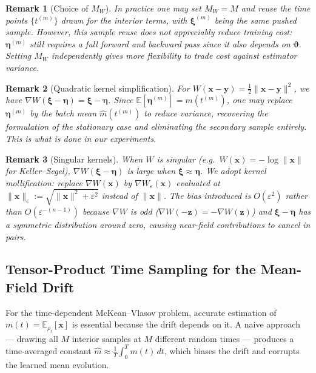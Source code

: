 \documentclass[12pt]{article}
\newcommand{\bx}{\mathbf{x}}
\newcommand{\by}{\mathbf{y}}
\newcommand{\bz}{\mathbf{z}}
\newcommand{\bxi}{\boldsymbol{\xi}}
\newcommand{\bfeta}{\boldsymbol{\eta}}
\newcommand{\vth}{\boldsymbol{\vartheta}}
\newcommand{\E}{\mathbb{E}}
\newcommand{\hatm}{\hat{m}}
\theoremstyle{plain}
\newtheorem{remark}{Remark}
\begin{document}
\begin{remark}[Choice of $M_W$]
In practice one may set $M_W=M$ and reuse the time points $\{t^{(m)}\}$ drawn for
the interior terms, with $\bxi^{(m)}$ being the same pushed sample. However, this sample
reuse does not appreciably reduce training cost: $\bfeta^{(m)}$ still requires a full
forward and backward pass since it also depends on $\vth$. Setting $M_W$ independently
gives more flexibility to trade cost against estimator variance.
\end{remark}

\begin{remark}[Quadratic kernel simplification]
For $W(\bx-\by)=\frac{1}{2}\|\bx-\by\|^2$, we have $\nabla W(\bxi-\bfeta)=\bxi-\bfeta$.
Since $\E[\bfeta^{(m)}]=m(t^{(m)})$, one may replace $\bfeta^{(m)}$ by the batch mean
$\hatm(t^{(m)})$ to reduce variance, recovering the formulation of the stationary case
and eliminating the secondary sample entirely. This is what is done in our experiments.
\end{remark}

\begin{remark}[Singular kernels]
When $W$ is singular (e.g.\ $W(\bx)=-\log\|\bx\|$ for Keller--Segel), $\nabla W(\bxi-\bfeta)$
is large when $\bxi\approx\bfeta$. We adopt kernel mollification: replace $\nabla W(\bx)$
by $\nabla W_\varepsilon(\bx)$ evaluated at $\|\bx\|_\varepsilon:=\sqrt{\|\bx\|^2+\varepsilon^2}$
instead of $\|\bx\|$. The bias introduced is $O(\varepsilon^2)$ rather than $O(\varepsilon^{-(n-1)})$
because $\nabla W$ is odd ($\nabla W(-\bz)=-\nabla W(\bz)$) and $\bxi-\bfeta$ has a
symmetric distribution around zero, causing near-field contributions to cancel in pairs.
\end{remark}

\subsection{Tensor-Product Time Sampling for the Mean-Field Drift}

For the time-dependent McKean--Vlasov problem, accurate estimation of
$m(t)=\E_{\rho_t}[\bx]$ is essential because the drift depends on it. A naive approach
--- drawing all $M$ interior samples at $M$ different random times --- produces a
time-averaged constant $\hatm\approx\frac{1}{T}\int_0^T m(t)\,dt$, which biases the
drift and corrupts the learned mean evolution.
\end{document}
